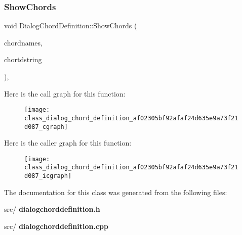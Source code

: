 \subsubsection{Show\+Chords}
{\footnotesize\ttfamily void Dialog\+Chord\+Definition\+::\+Show\+Chords (\begin{DoxyParamCaption}\item[{Q\+String\+List}]{chordnames,  }\item[{Q\+String}]{chortdstring }\end{DoxyParamCaption})\hspace{0.3cm}{\ttfamily [protected]}, {\ttfamily [slot]}}

Here is the call graph for this function\+:\nopagebreak
\begin{figure}[H]
\begin{center}
\leavevmode
\texttt{[image: class\_dialog\_chord\_definition\_af02305bf92afaf24d635e9a73f21d087\_cgraph]}
\end{center}
\end{figure}
Here is the caller graph for this function\+:\nopagebreak
\begin{figure}[H]
\begin{center}
\leavevmode
\texttt{[image: class\_dialog\_chord\_definition\_af02305bf92afaf24d635e9a73f21d087\_icgraph]}
\end{center}
\end{figure}


The documentation for this class was generated from the following files\+:\begin{DoxyCompactItemize}
\item 
src/\textbf{ dialogchorddefinition.\+h}\item 
src/\textbf{ dialogchorddefinition.\+cpp}\end{DoxyCompactItemize}
